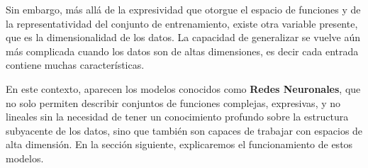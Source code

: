 \documentclass[../../main.tex]{subfiles}
\begin{document}
Sin embargo, más allá de la expresividad que otorgue el espacio de funciones y de la
representatividad del conjunto de entrenamiento, existe otra variable presente, que es la
dimensionalidad de los datos. La capacidad de generalizar se vuelve aún más complicada
cuando los datos son de altas dimensiones, es decir cada entrada contiene muchas
características.

En este contexto, aparecen los modelos conocidos como \textbf{Redes Neuronales}, que no
solo permiten describir conjuntos de funciones complejas, expresivas, y no lineales sin la
necesidad de tener un conocimiento profundo sobre la estructura subyacente de los datos,
sino que también son capaces de trabajar con espacios de alta dimensión. En la sección
siguiente, explicaremos el funcionamiento de estos modelos.
\end{document}
